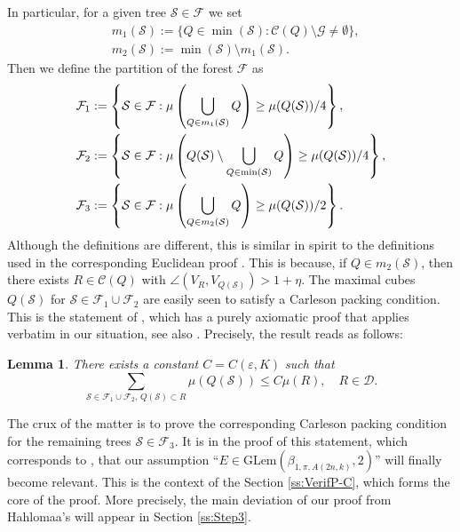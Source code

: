 \documentclass[12pt]{amsart}
\numberwithin{equation}{section}
\theoremstyle{plain}
\newtheorem{lemma}[theorem]{Lemma}
\theoremstyle{definition}
\theoremstyle{remark}
\begin{document}
In particular, for a given tree $ \mathcal S\in\mathcal F$ we set
\[\begin{split} &m_1(\mathcal S):=\{Q\in\min(\mathcal S): \mathcal C(Q)\setminus\mathcal G\neq\emptyset\},
\\ &m_2(\mathcal S):=\min(\mathcal S)\setminus m_1(\mathcal S).\end{split}\]
Then we define the partition of the forest $\mathcal F$ as
\[\begin{split}\mathcal F_1&:=\left\{\mathcal S\in\mathcal F: \mu \left(\bigcup_{Q\in m_1(\mathcal S)} Q\right)\geq \mu(Q(\mathcal S))/4\right\},\\ \mathcal F_2&:=\left\{\mathcal S\in\mathcal F: \mu \left(Q(\mathcal S)\setminus\bigcup_{Q\in \rm{min}(\mathcal S)} Q\right)\geq \mu(Q(\mathcal S))/4\right\},\\\mathcal F_3&:=\left\{\mathcal S\in\mathcal F: \mu \left(\bigcup_{Q\in m_2(\mathcal S)} Q\right)\geq \mu(Q(\mathcal S))/2\right\}.\end{split}\]
Although the definitions are different, this is similar in spirit to the definitions used in the corresponding Euclidean proof \cite[p.39]{David1}. This is because, if $Q\in m_2(\mathcal S)$, then there exists $R\in \mathcal C(Q)$ with $\angle(V_R, V_{Q(\mathcal S)})>1+\eta$.
The maximal cubes $Q(\mathcal{S})$ for $\mathcal{S}\in \mathcal{F}_1 \cup \mathcal{F}_2$ are easily seen to satisfy a Carleson packing condition. This is the statement of \cite[Lemma 4.2]{Hahlomaa}, which has a purely axiomatic proof that applies verbatim in our situation, 
see also \cite[p.39, Lemma 7.4]{David1}. Precisely, the result reads as follows:
\begin{lemma}
 There exists a constant $C=C(\varepsilon, K)$ such that
    \[\sum_{\mathcal S\in\mathcal F_1\cup\mathcal F_2,\,Q(\mathcal S)\subset R}\mu(Q(\mathcal S))\leq C\mu(R),\quad R\in\mathcal D.\]    
\end{lemma}
The crux of the matter is to prove the corresponding Carleson packing condition for the remaining trees $\mathcal{S}\in \mathcal{F}_3$. It is in the proof of this statement, which corresponds to 
\cite[(19)]{Hahlomaa}, that our assumption ``$E\in \mathrm{GLem}(\beta_{1,\pi,A(2n,k)},2)$'' will finally become relevant.
This is the context of the Section \ref{ss:VerifP-C}, which forms the core of the proof. More precisely, the main deviation of our proof from Hahlomaa's will appear in Section \ref{ss:Step3}.
\end{document}
